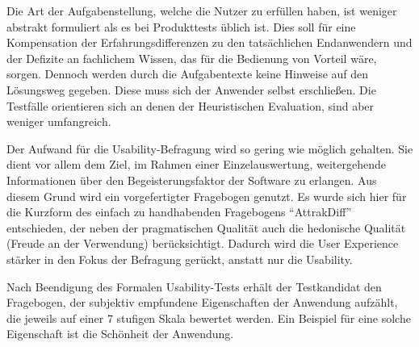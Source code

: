 Die Art der Aufgabenstellung, welche die Nutzer zu erfüllen haben, ist weniger abstrakt formuliert als es bei Produkttests üblich ist. Dies soll für eine Kompensation der Erfahrungsdifferenzen zu den tatsächlichen Endanwendern und der Defizite an fachlichem Wissen, das für die Bedienung von Vorteil wäre, sorgen. Dennoch werden durch die Aufgabentexte keine Hinweise auf den Lösungsweg gegeben. Diese muss sich der Anwender selbst erschließen. Die Testfälle orientieren sich an denen der Heuristischen Evaluation, sind aber weniger umfangreich.\par
{}\par
{}
Der Aufwand für die Usability-Befragung wird so gering wie möglich gehalten. Sie dient vor allem dem Ziel, im Rahmen einer Einzelauswertung, weitergehende Informationen über den Begeisterungsfaktor der Software zu erlangen. Aus diesem Grund wird ein vorgefertigter Fragebogen genutzt. Es wurde sich hier für die Kurzform des einfach zu handhabenden Fragebogens \enquote{AttrakDiff} entschieden, der neben der pragmatischen Qualität auch die hedonische Qualität (Freude an der Verwendung) berücksichtigt. Dadurch wird die User Experience stärker in den Fokus der Befragung gerückt, anstatt nur die Usability.\par
Nach Beendigung des Formalen Usability-Tests erhält der Testkandidat den Fragebogen, der  subjektiv empfundene Eigenschaften der Anwendung aufzählt, die jeweils auf einer 7 stufigen Skala bewertet werden. Ein Beispiel für eine solche Eigenschaft ist die Schönheit der Anwendung.\par
{}
